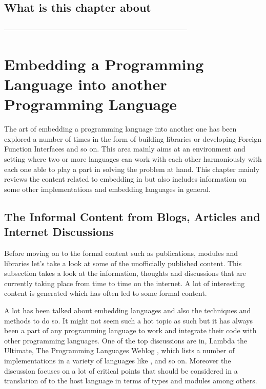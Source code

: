 \documentclass[thesis-solanki.tex]{subfiles}
\begin{document}
\section{What is this chapter about}

-----------------------------------------------------------------------------

\chapter{Embedding a Programming Language into another Programming Language }\label{chap:embedding}

The art of embedding a programming language into another one has been explored a number of times in the form
of building libraries or developing Foreign Function Interfaces and so on. This area mainly aims at an environment
and setting where two or more languages can work with each other harmoniously with each one able to play a part
in solving the problem at hand. This chapter mainly reviews the content related to embedding  in
 but also includes information on some other implementations and embedding languages in
general.


\section{The Informal Content from Blogs, Articles and Internet Discussions}

Before moving on to the formal content such as publications, modules and libraries let's take a look at some of the
unofficially published content.
This subsection takes a look at the information, thoughts and discussions that are currently taking place from time
to time on the internet.
A lot of interesting content is generated which has often led to some formal content.

A lot has been talked about embedding languages and also the techniques and methods to do so.
It might not seem such a hot topic as such but it has always been a part of any programming language to work and
integrate their code with other programming languages.
One of the top discussions are in, Lambda the Ultimate, The Programming Languages Weblog
\cite{website:lambda-the-ultimate},  which lists a number of  implementations in a variety of
languages like ,  \cite{racklog} and so on.
Moreover the discussion focuses on a lot of critical points that should be considered in a translation of
 to the host language in terms of types and modules among others.
\end{document}

